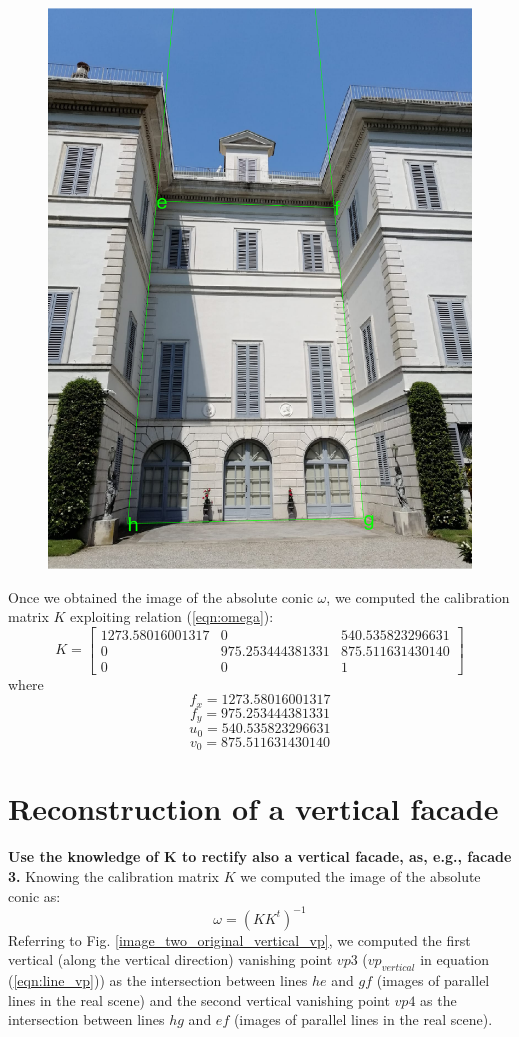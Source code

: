 \documentclass[11pt, oneside]{article}
\begin{document}
\begin{figure}[!h]
	\centering
	\includegraphics[width=0.30\linewidth]{image_original_vertical_vp.png}
	\label{image_original_vertical_vp}
\end{figure}
Once we obtained the image of the absolute conic $\omega$, we computed the calibration matrix $K$ exploiting relation (\ref{eqn:omega}):
\begin{equation}
	K =
	\begin{bmatrix}
		1273.58016001317 & 0 & 540.535823296631 \\
		0 & 975.253444381331 & 875.511631430140 \\
		0 & 0 & 1
	\end{bmatrix}
\end{equation}
where
$$f_x = 1273.58016001317$$
$$f_y = 975.253444381331$$
$$u_0 = 540.535823296631$$
$$v_0 = 875.511631430140$$


\section{Reconstruction of a vertical facade}
\textbf{Use the knowledge of K to rectify also a vertical facade, as, e.g., facade 3.} \hfill \break
Knowing the calibration matrix $K$ we computed the image of the absolute conic as:
\begin{equation}
	\omega = (KK^t)^{-1}
\end{equation}
Referring to Fig. \ref{image_two_original_vertical_vp}, we computed the first vertical (along the vertical direction) vanishing point $vp3$ ($vp_{vertical}$ in equation (\ref{eqn:line_vp})) as the intersection between lines $he$ and $gf$ (images of parallel lines in the real scene) and the second vertical vanishing point $vp4$ as the intersection between lines $hg$ and $ef$ (images of parallel lines in the real scene).
\end{document}
